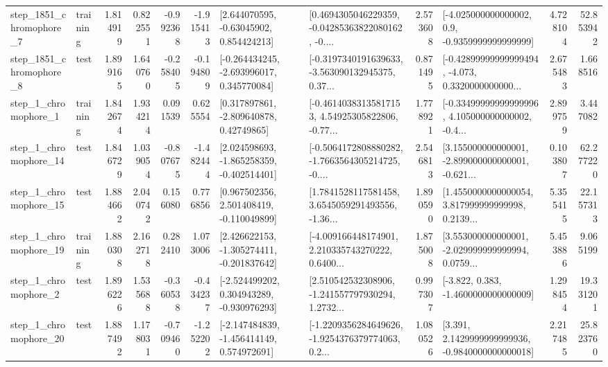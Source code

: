 \begin{tabular}{llrrrrllrlrr}
  step\_1851\_chromophore\_7 &  training &      1.814919 &    0.822551 &     -0.992368 & -1.915413 &     [2.644070595, -0.63045902, 0.854424213] &  [0.4694305046229359, -0.04285363822080162, -0.... &       2.573608 &     [-4.025000000000002, 0.9, -0.9359999999999999] &            4.728104 &         52.853942 \\
  step\_1851\_chromophore\_8 &      test &      1.899165 &    1.640760 &     -0.258405 & -0.194809 &   [-0.264434245, -2.693996017, 0.345770084] &  [-0.3197340191639633, -3.563090132945375, 0.37... &       0.871495 &  [-0.42899999999999494, -4.073, 0.3320000000000... &            2.675483 &          1.668516 \\
     step\_1\_chromophore\_1 &  training &      1.842674 &    1.934214 &      0.091539 &  0.625554 &     [0.317897861, -2.809640878, 0.42749865] &  [-0.46140383135817153, 4.54925305822806, -0.77... &       1.778921 &  [-0.33499999999999996, 4.105000000000002, -0.4... &            2.899759 &          3.447082 \\
    step\_1\_chromophore\_14 &      test &      1.846729 &    1.039054 &     -0.807675 & -1.482444 &   [2.024598693, -1.865258359, -0.402514401] &  [-0.5064172808880282, -1.7663564305214725, -0.... &       2.546813 &  [3.155000000000001, -2.899000000000001, -0.621... &            0.103807 &         62.277220 \\
    step\_1\_chromophore\_15 &      test &      1.884662 &    2.040742 &      0.156080 &  0.776856 &    [0.967502356, 2.501408419, -0.110049899] &  [1.7841528117581458, 3.6545059291493556, -1.36... &       1.890590 &  [1.4550000000000054, 3.817999999999998, 0.2139... &            5.355415 &         22.157313 \\
    step\_1\_chromophore\_19 &  training &      1.880308 &    2.162718 &      0.282410 &  1.073006 &   [2.426622153, -1.305274411, -0.201837642] &  [-4.009166448174901, 2.210335743270222, 0.6400... &       1.875008 &  [3.553000000000001, -2.029999999999994, 0.0759... &            5.453886 &          9.065199 \\
     step\_1\_chromophore\_2 &      test &      1.896226 &    1.535688 &     -0.360538 & -0.434237 &   [-2.524499202, 0.304943289, -0.930976293] &  [2.510542532308906, -1.241557797930294, 1.2732... &       0.997307 &               [-3.822, 0.383, -1.4600000000000009] &            1.298454 &         19.331201 \\
    step\_1\_chromophore\_20 &      test &      1.887492 &    1.178031 &     -0.709460 & -1.252202 &   [-2.147484839, -1.456414149, 0.574972691] &  [-1.2209356284649626, -1.9254376379774063, 0.2... &       1.080526 &   [3.391, 2.1429999999999936, -0.9840000000000018] &            2.217485 &         25.823760 \\

\end{tabular}
